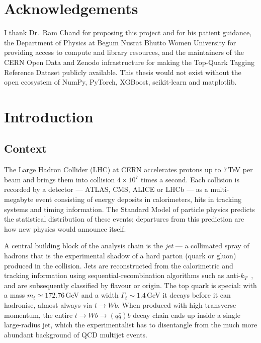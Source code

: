 \documentclass[12pt,a4paper,oneside]{report}
\begin{document}
\chapter*{Acknowledgements}
I thank Dr.\ Ram Chand for proposing this project and for his
patient guidance, the Department of Physics at Begum Nusrat Bhutto
Women University for providing access to compute and library
resources, and the maintainers of the CERN Open Data and Zenodo
infrastructure for making the Top-Quark Tagging Reference Dataset
publicly available. This thesis would not exist without the open
ecosystem of NumPy, PyTorch, XGBoost, scikit-learn and matplotlib.

\tableofcontents
\listoffigures
\listoftables

\chapter{Introduction}\label{ch:intro}

\section{Context}
The Large Hadron Collider (LHC) at CERN accelerates protons up to
$7$\,TeV per beam and brings them into collision $4\!\times\!10^7$
times a second.  Each collision is recorded by a detector --- ATLAS,
CMS, ALICE or LHCb --- as a multi-megabyte event consisting of
energy deposits in calorimeters, hits in tracking systems and timing
information.  The Standard Model of particle physics predicts the
statistical distribution of these events; departures from this
prediction are how new physics would announce itself.

A central building block of the analysis chain is the
\emph{jet} --- a collimated spray of hadrons that is the experimental
shadow of a hard parton (quark or gluon) produced in the collision.
Jets are reconstructed from the calorimetric and tracking
information using sequential-recombination algorithms such as
anti-$k_T$~\cite{cacciari}, and are subsequently classified by
flavour or origin.  The top quark is special: with a mass
$m_t\!\simeq\!172.76$\,GeV and a width $\Gamma_t\!\sim\!1.4$\,GeV it
decays before it can hadronise, almost always via $t\!\to\!Wb$.
When produced with high transverse momentum, the entire
$t\!\to\!Wb\!\to\!(q\bar q)b$ decay chain ends up inside a single
large-radius jet, which the experimentalist has to disentangle from
the much more abundant background of QCD multijet events.
\end{document}
